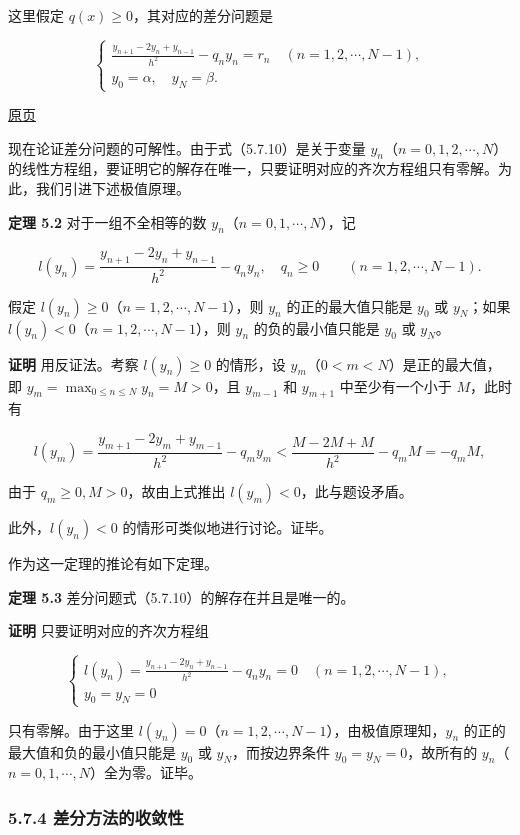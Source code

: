 \documentclass[
  10pt,
  fontset=fandol]{ctexart}
\begin{document}
这里假定 \(q(x)\ge0\)，其对应的差分问题是

\[
\begin{cases}
\displaystyle\frac{y_{n+1}-2y_n+y_{n-1}}{h^2}-q_ny_n=r_n\quad(n=1,2,\cdots,N-1),\\[6pt]
y_0=\alpha,\quad y_N=\beta.
\end{cases}
\tag{5.7.10}
\]

\href{../../source-images/pdf-151.jpeg}{原页}

现在论证差分问题的可解性。由于式（5.7.10）是关于变量 \(y_n\)（\(n=0,1,2,\cdots,N\)）的线性方程组，要证明它的解存在唯一，只要证明对应的齐次方程组只有零解。为此，我们引进下述极值原理。

\textbf{定理 5.2} 对于一组不全相等的数 \(y_n\)（\(n=0,1,\cdots,N\)），记

\[
l(y_n)=\frac{y_{n+1}-2y_n+y_{n-1}}{h^2}-q_ny_n,\quad q_n\ge0\qquad(n=1,2,\cdots,N-1).
\]

假定 \(l(y_n)\ge0\)（\(n=1,2,\cdots,N-1\)），则 \(y_n\) 的正的最大值只能是 \(y_0\) 或 \(y_N\)；如果 \(l(y_n)<0\)（\(n=1,2,\cdots,N-1\)），则 \(y_n\) 的负的最小值只能是 \(y_0\) 或 \(y_N\)。

\textbf{证明} 用反证法。考察 \(l(y_n)\ge0\) 的情形，设 \(y_m\)（\(0<m<N\)）是正的最大值，即 \(y_m=\max_{0\le n\le N}y_n=M>0\)，且 \(y_{m-1}\) 和 \(y_{m+1}\) 中至少有一个小于 \(M\)，此时有

\[
l(y_m)=\frac{y_{m+1}-2y_m+y_{m-1}}{h^2}-q_my_m<\frac{M-2M+M}{h^2}-q_mM=-q_mM,
\]

由于 \(q_m\ge0,M>0\)，故由上式推出 \(l(y_m)<0\)，此与题设矛盾。

此外，\(l(y_n)<0\) 的情形可类似地进行讨论。证毕。

作为这一定理的推论有如下定理。

\textbf{定理 5.3} 差分问题式（5.7.10）的解存在并且是唯一的。

\textbf{证明} 只要证明对应的齐次方程组

\[
\begin{cases}
\displaystyle l(y_n)=\frac{y_{n+1}-2y_n+y_{n-1}}{h^2}-q_ny_n=0\quad(n=1,2,\cdots,N-1),\\[6pt]
y_0=y_N=0
\end{cases}
\]

只有零解。由于这里 \(l(y_n)=0\)（\(n=1,2,\cdots,N-1\)），由极值原理知，\(y_n\) 的正的最大值和负的最小值只能是 \(y_0\) 或 \(y_N\)，而按边界条件 \(y_0=y_N=0\)，故所有的 \(y_n\)（\(n=0,1,\cdots,N\)）全为零。证毕。

\subsubsection{5.7.4 差分方法的收敛性}\label{ux5deeux5206ux65b9ux6cd5ux7684ux6536ux655bux6027}
\end{document}
